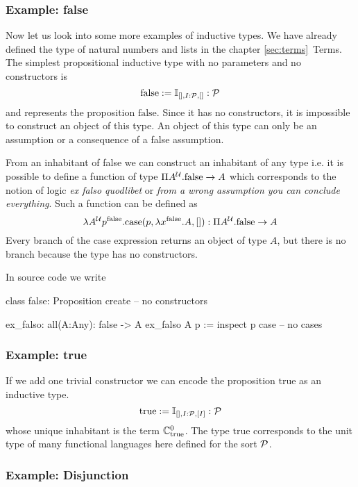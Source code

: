 \subsubsection{Example: false}

Now let us look into some more examples of inductive types. We have already
defined the type of natural numbers and lists in the chapter
\ref{sec:terms}~Terms.
%
The simplest propositional inductive type with no parameters and no
constructors is
$$
\text{false} := \mathbb{I}_{[], I:{\cal{P}}, []} : {\cal{P}}
$$
and represents the proposition $\text{false}$. Since it has no constructors,
it is impossible to construct an object of this type. An object of this type
can only be an assumption or a consequence of a false assumption.


From an inhabitant of false we can construct an inhabitant of any type i.e. it
is possible to define a function of type $\Pi A^{\cal{U}}. \text{false} \to A$
which corresponds to the notion of logic \emph{ex falso quodlibet} or
\emph{from a wrong assumption you can conclude everything}.
%
Such a function can be defined as
$$
\lambda A^{\cal{U}} p^\text{false}. \text{case}(p, \lambda x^\text{false}. A, [])
: \Pi A^{\cal{U}}. \text{false} \to A
$$
%
Every branch of the case expression returns an object of type $A$, but there
is no branch because the type has no constructors.

In source code we write
\begin{alba}
  class false: Proposition create
    -- no constructors

  ex_falso: all(A:Any): false -> A
  ex_falso A p :=
    inspect p case
      -- no cases
\end{alba}


\subsubsection{Example: true}

If we add one trivial constructor we can encode the proposition $\text{true}$
as an inductive type.
%
$$
\text{true} := \mathbb{I}_{[], I:{\cal{P}}, [I]} : {\cal{P}}
$$
whose unique inhabitant is the term $\mathbb{C}^0_{\text{true}}$. The type
$\text{true}$ corresponds to the unit type of many functional languages here
defined for the sort ${\cal{P}}$.



\subsubsection{Example: Disjunction}


